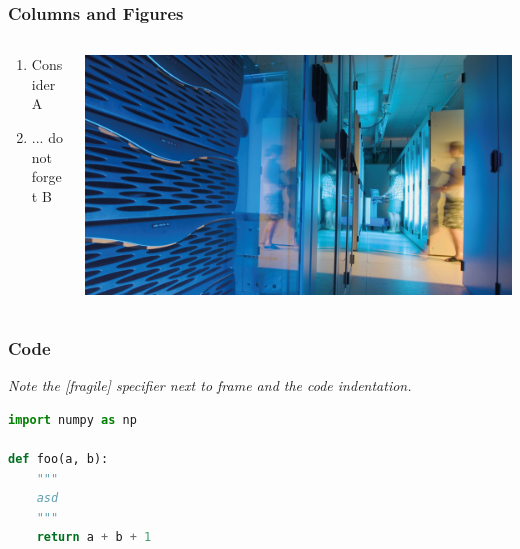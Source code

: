 \documentclass[aspectratio=1610]{beamer}
\begin{document}
\begin{frame}
    \frametitle{Columns and Figures}

    \begin{columns}
        \begin{column}{0.4\textwidth}
            \begin{enumerate}
                \item Consider A
                \item ... do not forget B
            \end{enumerate}
        \end{column}
        \begin{column}{0.4\textwidth}
            \centering
            \includegraphics[width=\textwidth]{logos/hgf_key_technologies.jpg}
        \end{column}
    \end{columns}
\end{frame}

\begin{frame}[fragile]
    \frametitle{Code}
    
    \emph{Note the [fragile] specifier next to frame and the code indentation.}
    
\begin{lstlisting}[language=Python]
import numpy as np

def foo(a, b):
    """
    asd
    """
    return a + b + 1
\end{lstlisting}
\end{frame}
\end{document}
